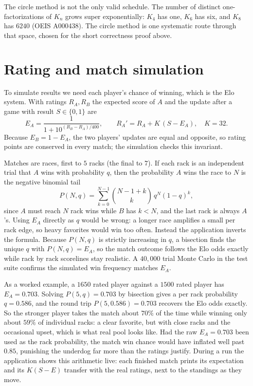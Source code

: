 \documentclass[11pt]{article}
\begin{document}
The circle method is not the only valid schedule. The number of distinct
one-factorizations of $K_n$ grows super exponentially: $K_4$ has one, $K_6$ has
six, and $K_8$ has $6240$ (OEIS A000438). The circle method is one systematic route
through that space, chosen for the short correctness proof above.

\section{Rating and match simulation}

To simulate results we need each player's chance of winning, which is the Elo
system. With ratings $R_A, R_B$ the expected score of $A$ and the update after a
game with result $S \in \{0,1\}$ are
\[
E_A = \frac{1}{1 + 10^{(R_B - R_A)/400}}, \qquad R_A' = R_A + K\,(S - E_A), \quad K=32.
\]
Because $E_B = 1 - E_A$, the two players' updates are equal and opposite, so rating
points are conserved in every match; the simulation checks this invariant.

Matches are races, first to $5$ racks (the final to $7$). If each rack is an
independent trial that $A$ wins with probability $q$, then the probability $A$ wins
the race to $N$ is the negative binomial tail
\[
P(N,q) = \sum_{k=0}^{N-1} \binom{N-1+k}{k}\, q^{N} (1-q)^{k},
\]
since $A$ must reach $N$ rack wins while $B$ has $k < N$, and the last rack is
always $A$'s. Using $E_A$ directly as $q$ would be wrong: a longer race amplifies a
small per rack edge, so heavy favorites would win too often. Instead the
application inverts the formula. Because $P(N,q)$ is strictly increasing in $q$, a
bisection finds the unique $q$ with $P(N,q) = E_A$, so the match outcome follows the
Elo odds exactly while rack by rack scorelines stay realistic. A $40{,}000$ trial
Monte Carlo in the test suite confirms the simulated win frequency matches $E_A$.

As a worked example, a $1650$ rated player against a $1500$ rated player has
$E_A = 0.703$. Solving $P(5,q) = 0.703$ by bisection gives a per rack probability
$q = 0.586$, and the round trip $P(5, 0.586) = 0.703$ recovers the Elo odds exactly.
So the stronger player takes the match about $70\%$ of the time while winning only
about $59\%$ of individual racks: a clear favorite, but with close racks and the
occasional upset, which is what real pool looks like. Had the raw $E_A = 0.703$ been
used as the rack probability, the match win chance would have inflated well past
$0.85$, punishing the underdog far more than the ratings justify. During a run the
application shows this arithmetic live: each finished match prints its expectation
and its $K(S-E)$ transfer with the real ratings, next to the standings as they move.
\end{document}
